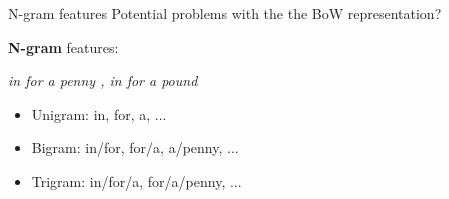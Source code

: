 \documentclass[usenames,dvipsnames,notes,11pt,aspectratio=169]{beamer}
\newcommand{\pdfnote}[1]{}
\begin{document}
%

\begin{frame}
    {N-gram features}
    Potential problems with the the BoW representation?

    \medskip\pause
    \textbf{N-gram} features:
    \begin{center}
        \textit{in for a penny , in for a pound}
    \end{center}
    \begin{itemize}
        \item Unigram: in, for, a, ...
        \item Bigram: in/for, for/a, a/penny, ...
        \item Trigram: in/for/a, for/a/penny, ...
    \end{itemize}

    \medskip
    \pdfnote{
        BoW problem: new york, don't like
    }
\end{frame}
\end{document}
